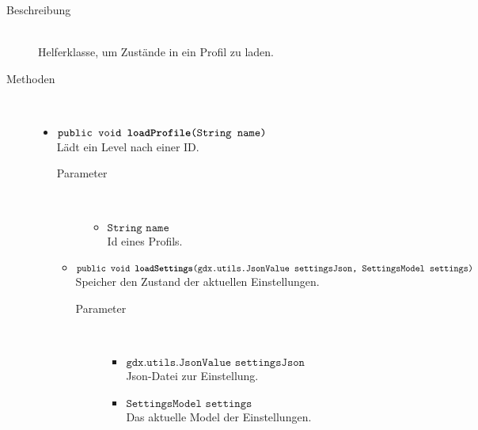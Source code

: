 \begin{description}
\item[Beschreibung] \hfill \\ Helferklasse, um Zustände in ein Profil zu laden.

\item[Methoden] \hfill \\
	\vspace{-.8cm}
	\begin{itemize}
		\item $\texttt{public void \textbf{loadProfile}(String name)}$ \\ Lädt ein Level nach einer ID.
		\begin{description}
			\item[Parameter] \hfill \\
			\vspace{-.8cm}
			\begin{itemize}
				\item $\texttt{String name}$ \\ Id eines Profils.
			\end{itemize}
		\end{description}
		
		\begin{itemize}
		\item $\texttt{public void \textbf{loadSettings}(gdx.utils.JsonValue settingsJson, SettingsModel settings)}$ \\ Speicher den Zustand der aktuellen Einstellungen.
				\begin{description}
			\item[Parameter] \hfill \\
			\vspace{-.8cm}
			\begin{itemize}
				\item $\texttt{gdx.utils.JsonValue settingsJson}$ \\ Json-Datei zur Einstellung.
								\item $\texttt{SettingsModel settings}$ \\ Das aktuelle Model der Einstellungen.
			\end{itemize}
		\end{description}
		

\end{itemize}
\end{itemize}
\end{description}
